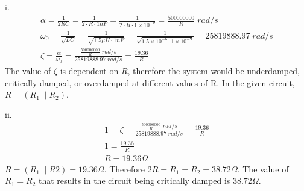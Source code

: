 \documentclass[12pt]{article}
\begin{document}
\thispagestyle{prelabheader}
i.
\[
\begin{gathered}
    \alpha = \frac{1}{2RC} = \frac{1}{2 \cdot R\cdot 1nF} = \frac{1}{2\cdot R\cdot 1\times 10^{-9}} = \frac{500000000}{R}\; rad/s \\
    \omega_0 = \frac{1}{\sqrt{LC}} = \frac{1}{\sqrt{1.5\mu H \cdot 1nF}} = \frac{1}{\sqrt{1.5\times 10^{-6} \cdot 1\times 10^{-9}}} = 25819888.97\; rad/s \\
    \zeta = \frac{\alpha}{\omega_0} = \frac{\frac{500000000}{R}\; rad/s}{25819888.97\; rad/s} = \frac{19.36}{R}
\end{gathered}
\]
The value of $\zeta$ is dependent on $R$, therefore the system would be underdamped, critically damped, or overdamped at different values of R. In the given circuit, $R = (R_1\; ||\; R_2)$.

ii.
\[
\begin{gathered}
    1 = \zeta = \frac{\frac{500000000}{R}\; rad/s}{25819888.97\; rad/s} = \frac{19.36}{R} \\
    1 = \frac{19.36}{R} \\
    R = 19.36\Omega
\end{gathered}
\]
$R = (R_1\; ||\; R2) = 19.36\Omega$. Therefore $2R = R_1 = R_2 = 38.72\Omega$. The value of $R_1 = R_2$ that results in the circuit being critically damped is $38.72\Omega$.
\end{document}
